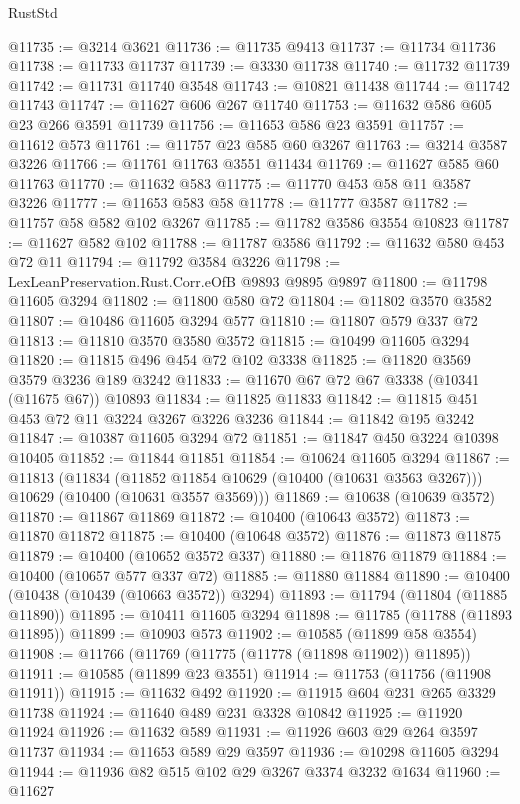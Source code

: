 \begin{lexlean}{RustStd}
\begin{coremodule}
{\begin{coremodule}
{{{{{{{{{{{{{{{{{{{{{{{{{@11735 := @3214 @3621
@11736 := @11735 @9413
@11737 := @11734 @11736
@11738 := @11733 @11737
@11739 := @3330 @11738
@11740 := @11732 @11739
@11742 := @11731 @11740 @3548
@11743 := @10821 @11438
@11744 := @11742 @11743
@11747 := @11627 @606 @267 @11740
@11753 := @11632 @586 @605 @23 @266 @3591 @11739
@11756 := @11653 @586 @23 @3591
@11757 := @11612 @573
@11761 := @11757 @23 @585 @60 @3267
@11763 := @3214 @3587 @3226
@11766 := @11761 @11763 @3551 @11434
@11769 := @11627 @585 @60 @11763
@11770 := @11632 @583
@11775 := @11770 @453 @58 @11 @3587 @3226
@11777 := @11653 @583 @58
@11778 := @11777 @3587
@11782 := @11757 @58 @582 @102 @3267
@11785 := @11782 @3586 @3554 @10823
@11787 := @11627 @582 @102
@11788 := @11787 @3586
@11792 := @11632 @580 @453 @72 @11
@11794 := @11792 @3584 @3226
@11798 := LexLeanPreservation.Rust.Corr.eOfB @9893 @9895 @9897
@11800 := @11798 @11605 @3294
@11802 := @11800 @580 @72
@11804 := @11802 @3570 @3582
@11807 := @10486 @11605 @3294 @577
@11810 := @11807 @579 @337 @72
@11813 := @11810 @3570 @3580 @3572
@11815 := @10499 @11605 @3294
@11820 := @11815 @496 @454 @72 @102 @3338
@11825 := @11820 @3569 @3579 @3236 @189 @3242
@11833 := @11670 @67 @72 @67 @3338 (@10341 (@11675 @67)) @10893
@11834 := @11825 @11833
@11842 := @11815 @451 @453 @72 @11 @3224 @3267 @3226 @3236
@11844 := @11842 @195 @3242
@11847 := @10387 @11605 @3294 @72
@11851 := @11847 @450 @3224 @10398 @10405
@11852 := @11844 @11851
@11854 := @10624 @11605 @3294
@11867 := @11813
    (@11834
      (@11852 @11854 @10629 (@10400 (@10631 @3563 @3267)))
      @10629
      (@10400 (@10631 @3557 @3569)))
@11869 := @10638 (@10639 @3572)
@11870 := @11867 @11869
@11872 := @10400 (@10643 @3572)
@11873 := @11870 @11872
@11875 := @10400 (@10648 @3572)
@11876 := @11873 @11875
@11879 := @10400 (@10652 @3572 @337)
@11880 := @11876 @11879
@11884 := @10400 (@10657 @577 @337 @72)
@11885 := @11880 @11884
@11890 := @10400 (@10438 (@10439 (@10663 @3572)) @3294)
@11893 := @11794 (@11804 (@11885 @11890))
@11895 := @10411 @11605 @3294
@11898 := @11785 (@11788 (@11893 @11895))
@11899 := @10903 @573
@11902 := @10585 (@11899 @58 @3554)
@11908 := @11766 (@11769 (@11775 (@11778 (@11898 @11902)) @11895))
@11911 := @10585 (@11899 @23 @3551)
@11914 := @11753 (@11756 (@11908 @11911))
@11915 := @11632 @492
@11920 := @11915 @604 @231 @265 @3329 @11738
@11924 := @11640 @489 @231 @3328 @10842
@11925 := @11920 @11924
@11926 := @11632 @589
@11931 := @11926 @603 @29 @264 @3597 @11737
@11934 := @11653 @589 @29 @3597
@11936 := @10298 @11605 @3294
@11944 := @11936 @82 @515 @102 @29 @3267 @3374 @3232 @1634
@11960 := @11627
}}}}}}}}}}}}}}}}}}}}}}}}}
\end{coremodule}}
\end{coremodule}
\end{lexlean}
